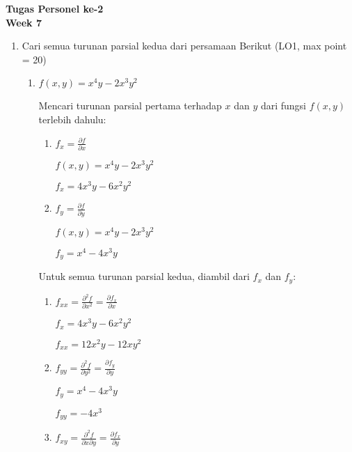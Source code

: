 \documentclass[a4paper]{article}
\begin{document}
\pagestyle{empty}

\begin{center}
    {\LARGE \textbf{Tugas Personel ke-2}}\\[0.5em]
    {\Large \textbf{Week 7}}
\end{center}

\begin{enumerate}[itemsep=1em,leftmargin=*]
  \item Cari semua turunan parsial kedua dari persamaan Berikut (LO1, max point = 20)
  \begin{enumerate}[itemsep=1em]
    \item \(f(x,y) = x^4y - 2x^3y^2\)

    Mencari turunan parsial pertama terhadap \(x\) dan \(y\) dari fungsi \(f(x,y)\) terlebih dahulu:

    \begin{enumerate}[itemsep=1em,leftmargin=*]
        \item \(f_x = \frac{\partial f}{\partial x}\)

        \(f(x,y) = x^4y - 2x^3y^2\)

        \(f_x = 4x^3y - 6x^2y^2\)

        \item \(f_y = \frac{\partial f}{\partial y}\)

        \(f(x,y) = x^4y - 2x^3y^2\)

        \(f_y = x^4 - 4x^3y\)

    \end{enumerate}

    Untuk semua turunan parsial kedua, diambil dari \(f_x\) dan \(f_y\):

    \begin{enumerate}[itemsep=1em,leftmargin=*]
        \item \(f_{xx} = \frac{\partial^2 f}{\partial x^2} = \frac{\partial f_x}{\partial x}\)

        \(f_x = 4x^3y - 6x^2y^2\)

        \(f_{xx} = 12x^2y - 12xy^2\)

        \item \(f_{yy} = \frac{\partial^2 f}{\partial y^2} = \frac{\partial f_y}{\partial y}\)

        \(f_y = x^4 - 4x^3y\)

        \(f_{yy} = -4x^3\)

        \item \(f_{xy} = \frac{\partial^2 f}{\partial x \partial y} = \frac{\partial f_x}{\partial y}\)


\end{enumerate}
\end{enumerate}
\end{enumerate}
\end{document}

